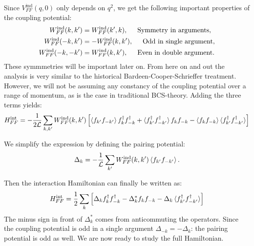 Since $V^\text{ind}_{FF}(q,0)$ only depends on $q^2$, we get the following important properties of the coupling potential: 
\begin{align}
W^\text{ind}_{FF}(k,k') &= W^\text{ind}_{FF}(k',k), \hspace{0.5cm} \text{Symmetry in arguments}, \nonumber \\
W^\text{ind}_{FF}(-k,k') &= -W^\text{ind}_{FF}(k,k'), \hspace{0.5cm} \text{Odd in single argument}, \nonumber \\
W^\text{ind}_{FF}(-k,-k') &= W^\text{ind}_{FF}(k,k'), \hspace{0.5cm} \text{Even in double argument}.
\label{eq.CouplingPotentialSymmetries}
\end{align}
These symmmetries will be important later on. From here on and out the analysis is very similar to the historical Bardeen-Cooper-Schrieffer treatment. However, we will not be assuming any constancy of the coupling potential over a range of momentum, as is the case in traditional BCS-theory\cite{Tinkham,LandauStatPhys2,PlischkeStatPhys}. Adding the three terms yields:
\begin{equation}
H^\text{int}_{FF} = -\frac{1}{2\mathcal{L}}\sum_{k,k'} W^\text{ind}_{FF}(k,k')\left[ \braket{ f_{k'}f_{-k'}} f^\dagger_k f^\dagger_{-k} + \braket {f^\dagger_{k'}f^\dagger_{-k'}} f_k f_{-k} - \braket {f_{k}f_{-k}} \braket {f^\dagger_{k'}f^\dagger_{-k'}} \right] \nonumber
\end{equation}

We simplify the expression by defining the pairing potential:
\begin{equation}
\Delta_k = -\frac{1}{\mathcal{L}}\sum_{k'}W^\text{ind}_{FF}(k,k')\braket {f_{k'}f_{-k'}}.
\label{eq.pairingpotentialdef}
\end{equation}

Then the interaction Hamiltonian can finally be written as:
\begin{equation}
H^\text{int}_{FF} = \frac{1}{2}\sum_{k} \left[ \Delta_k f^\dagger_k f^\dagger_{-k} - \Delta^*_k f_k f_{-k} - \Delta_k \braket {f^\dagger_{k'}f^\dagger_{-k'}} \right]
\label{eq.HFFintfinal}
\end{equation}
The minus sign in front of $\Delta^*_k$ comes from anticommuting the operators. Since the coupling potential is odd in a single argument $\Delta_{-k} = -\Delta_k$: the pairing potential is odd as well. We are now ready to study the full Hamiltonian.

